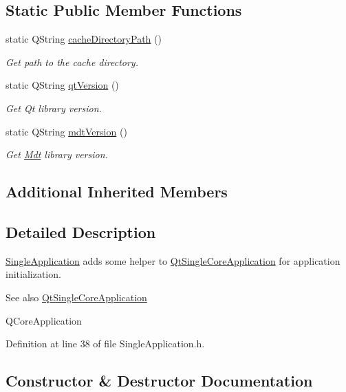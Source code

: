 \subsection*{Static Public Member Functions}
\begin{DoxyCompactItemize}
\item 
static Q\+String \hyperlink{class_mdt_1_1_single_application_a4f3aae54824f81697a17e7b1e173feec}{cache\+Directory\+Path} ()
\begin{DoxyCompactList}\small\item\em Get path to the cache directory. \end{DoxyCompactList}\item 
static Q\+String \hyperlink{class_mdt_1_1_single_application_a0f66bbb8cadc93f8185d3d4c92e3685e}{qt\+Version} ()
\begin{DoxyCompactList}\small\item\em Get Qt library version. \end{DoxyCompactList}\item 
static Q\+String \hyperlink{class_mdt_1_1_single_application_a9b31e7b78f87a9aa37ffadaf893b0cec}{mdt\+Version} ()
\begin{DoxyCompactList}\small\item\em Get \hyperlink{namespace_mdt}{Mdt} library version. \end{DoxyCompactList}\end{DoxyCompactItemize}
\subsection*{Additional Inherited Members}


\subsection{Detailed Description}
\hyperlink{class_mdt_1_1_single_application}{Single\+Application} adds some helper to \hyperlink{class_qt_single_core_application}{Qt\+Single\+Core\+Application} for application initialization. 

\begin{DoxySeeAlso}{See also}
\hyperlink{class_qt_single_core_application}{Qt\+Single\+Core\+Application} 

Q\+Core\+Application 
\end{DoxySeeAlso}


Definition at line 38 of file Single\+Application.\+h.



\subsection{Constructor \& Destructor Documentation}
